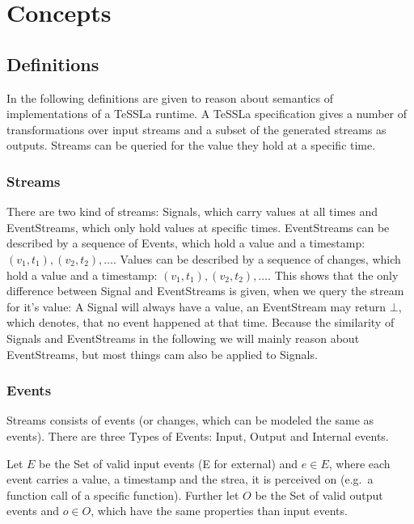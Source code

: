 \chapter{Concepts}
\label{sec:concepts}

\section{Definitions}
\label{sec:concepts:defs}

In the following definitions are given to reason about semantics of implementations of a TeSSLa runtime.
A TeSSLa specification gives a number of transformations over input streams and a subset of the generated streams as outputs.
Streams can be queried for the value they hold at a specific time.

\subsection{Streams}
\label{sec:concepts:defs:streams}

There are two kind of streams: Signals, which carry values at all times and EventStreams, which only hold values at specific times.
EventStreams can be described by a sequence of Events, which hold a value and a timestamp: \((v_1,t_1),(v_2,t_2),\ldots\).
Values can be described by a sequence of changes, which hold a value and a timestamp: \((v_1,t_1),(v_2,t_2),\ldots\).
This shows that the only difference between Signal and EventStreams is given, when we query the stream for it's value:
A Signal will always have a value, an EventStream may return \(\bot\), which denotes, that no event happened at that time.
Because the similarity of Signals and EventStreams in the following we will mainly reason about EventStreams, but most things cam also be applied to Signals.

\subsection{Events}
\label{sec:concepts:defs:events}

Streams consists of events (or changes, which can be modeled the same as events).
There are three Types of Events: Input, Output and Internal events.

Let \(E\) be the Set of valid input events (E for external) and \(e \in E\), where each event carries a value, a timestamp and the
strea, it is perceived on (e.g.\ a function call of a specific function).
Further let \(O\) be the Set of valid output events and \(o \in O\), which have the same properties than input events.


